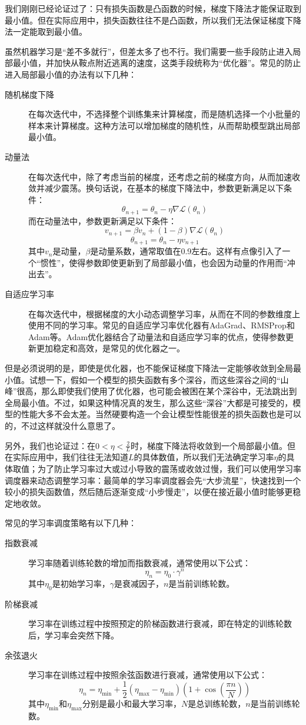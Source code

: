 我们刚刚已经论证过了：只有损失函数是凸函数的时候，梯度下降法才能保证取到最小值。但在实际应用中，损失函数往往不是凸函数，所以我们无法保证梯度下降法一定能取到最小值。

虽然机器学习是“差不多就行”，但差太多了也不行。我们需要一些手段防止进入局部最小值，并加快从鞍点附近逃离的速度，这类手段统称为“优化器”。常见的防止进入局部最小值的办法有以下几种：
\begin{description}
    \item[随机梯度下降] 在每次迭代中，不选择整个训练集来计算梯度，而是随机选择一个小批量的样本来计算梯度。这种方法可以增加梯度的随机性，从而帮助模型跳出局部最小值。
    \item[动量法] 在每次迭代中，除了考虑当前的梯度，还考虑之前的梯度方向，从而加速收敛并减少震荡。换句话说，在基本的梯度下降法中，参数更新满足以下条件：
        \[\theta_{n+1} = \theta_n - \eta \nabla \mathcal{L}(\theta_n)\]
        而在动量法中，参数更新满足以下条件：
        \[v_{n+1} = \beta v_n + (1 - \beta) \nabla \mathcal{L}(\theta_n)\]
        \[\theta_{n+1} = \theta_n - \eta v_{n+1}\]
        其中$v_n$是动量，$\beta$是动量系数，通常取值在0.9左右。这样有点像引入了一个“惯性”，使得参数即使更新到了局部最小值，也会因为动量的作用而“冲出去”。
    \item[自适应学习率] 在每次迭代中，根据梯度的大小动态调整学习率，从而在不同的参数维度上使用不同的学习率。常见的自适应学习率优化器有AdaGrad、RMSProp和Adam等。Adam优化器结合了动量法和自适应学习率的优点，使得参数更新更加稳定和高效，是常见的优化器之一。
\end{description}

但是必须说明的是，即使是优化器，也不能保证梯度下降法一定能够收敛到全局最小值。试想一下，假如一个模型的损失函数有多个深谷，而这些深谷之间的“山峰”很高，那么即使我们使用了优化器，也可能会被困在某个深谷中，无法跳出到全局最小值。不过，如果这种情况真的发生，那么这些“深谷”大都是可接受的，模型的性能大多不会太差。当然硬要构造一个会让模型性能很差的损失函数也是可以的，不过这样就没什么意思了。

另外，我们也论证过：在$ 0 < \eta < \frac{2}{L}$时，梯度下降法将收敛到一个局部最小值。但在实际应用中，我们往往无法知道$L$的具体数值，所以我们无法确定学习率$\eta$的具体取值；为了防止学习率过大或过小导致的震荡或收敛过慢，我们可以使用学习率调度器来动态调整学习率：最简单的学习率调度器会先“大步流星”，快速找到一个较小的损失函数值，然后随后逐渐变成“小步慢走”，以便在接近最小值时能够更稳定地收敛。

常见的学习率调度策略有以下几种：
\begin{description}
    \item[指数衰减] 学习率随着训练轮数的增加而指数衰减，通常使用以下公式：
        \[\eta_n = \eta_0 \cdot \gamma^n\]
        其中$\eta_0$是初始学习率，$\gamma$是衰减因子，$n$是当前训练轮数。
    \item[阶梯衰减] 学习率在训练过程中按照预定的阶梯函数进行衰减，即在特定的训练轮数后，学习率会突然下降。
    \item[余弦退火] 学习率在训练过程中按照余弦函数进行衰减，通常使用以下公式：
        \[\eta_n = \eta_\text{min} + \frac{1}{2}(\eta_\text{max} - \eta_\text{min})(1 + \cos(\frac{\pi n}{N}))\]
        其中$\eta_\text{min}$和$\eta_\text{max}$分别是最小和最大学习率，$N$是总训练轮数，$n$是当前训练轮数。
\end{description}

